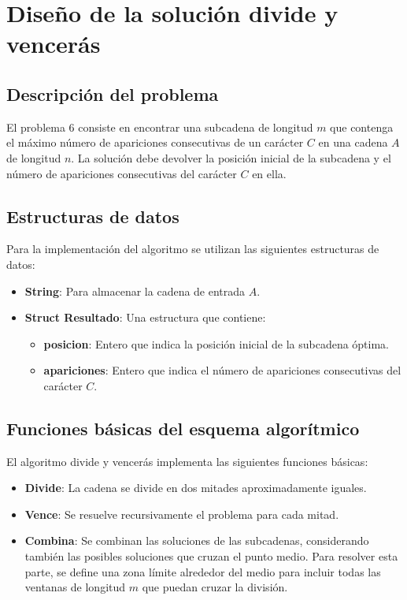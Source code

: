 \documentclass[12pt,a4paper]{article}
\begin{document}
\section{Diseño de la solución divide y vencerás}

\subsection{Descripción del problema}
El problema 6 consiste en encontrar una subcadena de longitud \( m \) que contenga el máximo número de apariciones consecutivas de un carácter \( C \) en una cadena \( A \) de longitud \( n \). La solución debe devolver la posición inicial de la subcadena y el número de apariciones consecutivas del carácter \( C \) en ella.

\subsection{Estructuras de datos}
Para la implementación del algoritmo se utilizan las siguientes estructuras de datos:
\begin{itemize}
    \item \textbf{String}: Para almacenar la cadena de entrada \( A \).
    \item \textbf{Struct Resultado}: Una estructura que contiene:
    \begin{itemize}
        \item \textbf{posicion}: Entero que indica la posición inicial de la subcadena óptima.
        \item \textbf{apariciones}: Entero que indica el número de apariciones consecutivas del carácter \( C \).
    \end{itemize}
\end{itemize}

\subsection{Funciones básicas del esquema algorítmico}
El algoritmo divide y vencerás implementa las siguientes funciones básicas:
\begin{itemize}
    \item \textbf{Divide}: La cadena se divide en dos mitades aproximadamente iguales.
    \item \textbf{Vence}: Se resuelve recursivamente el problema para cada mitad.
    \item \textbf{Combina}: Se combinan las soluciones de las subcadenas, considerando también las posibles soluciones que cruzan el punto medio. Para resolver esta parte, se define una zona límite alrededor del medio para incluir todas las ventanas de longitud \( m \) que puedan cruzar la división.
\end{itemize}
\end{document}
